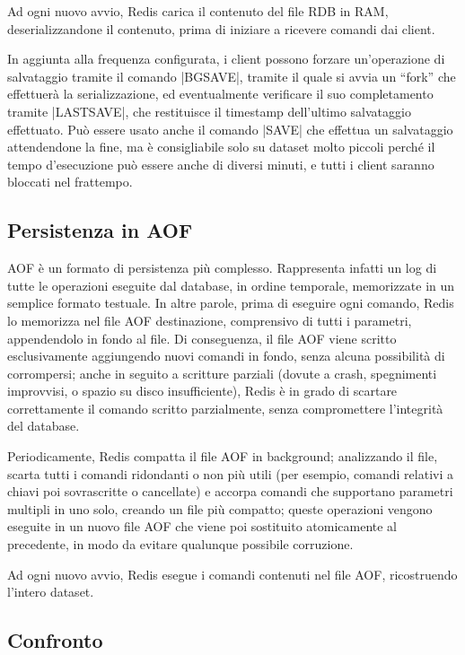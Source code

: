 Ad ogni nuovo avvio, Redis carica il contenuto del file RDB in RAM, deserializzandone il contenuto,
prima di iniziare a ricevere comandi dai client.

In aggiunta alla frequenza configurata, i client possono forzare un'operazione di salvataggio 
tramite il comando \cverb|BGSAVE|, tramite il quale si avvia un ``fork'' che effettuerà la
serializzazione, ed eventualmente verificare il suo completamento tramite \cverb|LASTSAVE|, che
restituisce il timestamp dell'ultimo salvataggio effettuato. Può essere usato anche il comando
\cverb|SAVE| che effettua un salvataggio attendendone la fine, ma è consigliabile solo su dataset
molto piccoli perché il tempo d'esecuzione può essere anche di diversi minuti, e tutti i client
saranno bloccati nel frattempo.


\subsection{Persistenza in AOF}
\label{sec:durability:aof}

AOF è un formato di persistenza più complesso. Rappresenta infatti un log di tutte le operazioni
eseguite dal database, in ordine temporale, memorizzate in un semplice formato testuale. In altre
parole, prima di eseguire ogni comando, Redis lo memorizza nel file AOF destinazione, comprensivo di
tutti i parametri, appendendolo in fondo al file. Di conseguenza, il file AOF viene scritto
esclusivamente aggiungendo nuovi comandi in fondo, senza alcuna possibilità di corrompersi; anche in
seguito a scritture parziali (dovute a crash, spegnimenti improvvisi, o spazio su disco
insufficiente), Redis è in grado di scartare correttamente il comando scritto parzialmente, senza
compromettere l'integrità del database.

Periodicamente, Redis compatta il file AOF in background; analizzando il file, scarta tutti i
comandi ridondanti o non più utili (per esempio, comandi relativi a chiavi poi sovrascritte o
cancellate) e accorpa comandi che supportano parametri multipli in uno solo, creando un file più
compatto; queste operazioni vengono eseguite in un nuovo file AOF che viene poi sostituito
atomicamente al precedente, in modo da evitare qualunque possibile corruzione.

Ad ogni nuovo avvio, Redis esegue i comandi contenuti nel file AOF, ricostruendo l'intero dataset.


\subsection{Confronto}

